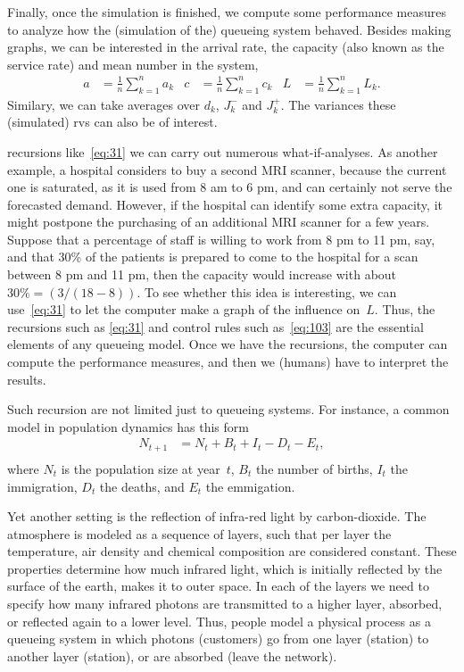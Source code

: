 \documentclass[stochastic-or.tex]{subfiles}
\begin{document}
Finally, once the simulation is finished, we compute some performance measures to analyze how the (simulation of the) queueing system behaved.
Besides making graphs, we can be interested in the arrival rate, the capacity (also known as the service rate) and mean number in the system,
\begin{align*}
a &= \frac{1}{n} \sum_{k=1}^{n} a_{k} &
c &= \frac{1}{n} \sum_{k=1}^{n} c_{k} &
L &= \frac{1}{n} \sum_{k=1}^{n} L_{k}.
\end{align*}
Similary, we can take averages over $d_{k}$, $J_k^{-}$ and $J_k^{+}$. The variances these (simulated) rvs can also be of interest.


 recursions like~\cref{eq:31} we can carry out numerous what-if-analyses.
As another example, a hospital considers to buy a second MRI scanner, because the current one is saturated, as it is used from 8 am to 6 pm, and can certainly not serve the forecasted demand.
However, if the hospital can identify some extra capacity, it might postpone the purchasing of an additional MRI scanner for a few years.
Suppose that a percentage of staff is willing to work from 8 pm to 11 pm, say, and that 30\% of the patients
is prepared to come to the hospital for a scan between 8 pm and 11 pm, then the capacity would increase with about $30\% = (3/(18-8))$.
To see whether this idea is interesting, we can use~\cref{eq:31} to let the computer make a graph of the influence on~$L$.
Thus, the recursions such as \cref{eq:31} and control rules such as~\cref{eq:103} are the essential elements of any queueing model.
Once we have the recursions, the computer can compute the performance measures, and then we (humans) have to interpret the results.

Such recursion are not limited just to queueing systems. For instance, a common model in population dynamics has this form
\begin{align*}
  N_{t+1} &= N_t + B_t + I_t - D_t - E_{t}, \\
\end{align*}
where $N_t$ is the population size at year~$t$, $B_{t}$ the number of births, $I_{t}$ the immigration, $D_{t}$ the deaths, and $E_{t}$ the emmigation.

Yet another setting is the reflection of infra-red light by carbon-dioxide.
The atmosphere is modeled as a sequence of layers, such that per layer the temperature, air density and chemical composition are considered constant.
These properties determine how much infrared light, which is initially reflected by the surface of the earth, makes it to outer space.
In each of the layers we need to specify how many infrared photons are transmitted to a higher layer, absorbed, or reflected again to a lower level.
Thus, people model a physical process as a queueing system in which photons (customers) go from one layer (station) to another layer (station), or are absorbed (leave the network).
\end{document}
